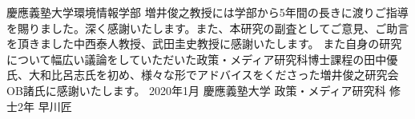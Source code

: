 \begin{acknowledgment}

慶應義塾大学環境情報学部 増井俊之教授には学部から5年間の長きに渡りご指導を賜りました。深く感謝いたします。また、本研究の副査としてご意見、ご助言を頂きました中西泰人教授、武田圭史教授に感謝いたします。
また自身の研究について幅広い議論をしていただいた政策・メディア研究科博士課程の田中優氏、大和比呂志氏を初め、様々な形でアドバイスをくださった増井俊之研究会OB諸氏に感謝いたします。
2020年1月 慶應義塾大学 政策・メディア研究科 修士2年 早川匠

\end{acknowledgment}
